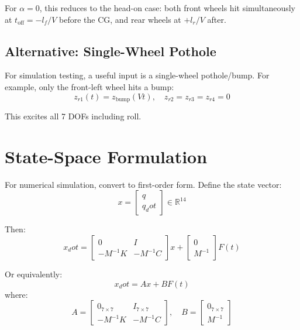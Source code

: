 \documentclass[11pt]{article}
\def\vect#1{#1}%
\def\dot#1{#1_dot}%
\newcommand{\vect}[1]{\bm{#1}}
\begin{document}
For $\alpha = 0$, this reduces to the head-on case: both front wheels hit simultaneously at $t_{\text{off}} = -l_f/V$ before the CG, and rear wheels at $+l_r/V$ after.

\subsection{Alternative: Single-Wheel Pothole}

For simulation testing, a useful input is a single-wheel pothole/bump. For example, only the front-left wheel hits a bump:
\begin{equation}
z_{r1}(t) = z_{\text{bump}}(Vt), \quad z_{r2} = z_{r3} = z_{r4} = 0
\end{equation}

This excites all 7 DOFs including roll.

\section{State-Space Formulation}

For numerical simulation, convert to first-order form. Define the state vector:
\begin{equation}
\vect{x} = \begin{bmatrix} \vect{q} \\ \dot{\vect{q}} \end{bmatrix} \in \mathbb{R}^{14}
\end{equation}

Then:
\begin{equation}
\dot{\vect{x}} = \begin{bmatrix} \vect{0} & \vect{I} \\ -\vect{M}^{-1}\vect{K} & -\vect{M}^{-1}\vect{C} \end{bmatrix} \vect{x} + \begin{bmatrix} \vect{0} \\ \vect{M}^{-1} \end{bmatrix} \vect{F}(t)
\end{equation}

Or equivalently:
\begin{equation}
\boxed{\dot{\vect{x}} = \vect{A}\vect{x} + \vect{B}\vect{F}(t)}
\end{equation}
where:
\begin{equation}
\vect{A} = \begin{bmatrix} \vect{0}_{7\times7} & \vect{I}_{7\times7} \\ -\vect{M}^{-1}\vect{K} & -\vect{M}^{-1}\vect{C} \end{bmatrix}, \quad
\vect{B} = \begin{bmatrix} \vect{0}_{7\times7} \\ \vect{M}^{-1} \end{bmatrix}
\end{equation}
\end{document}
